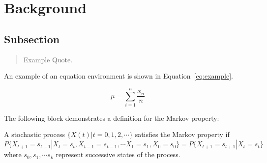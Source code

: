 \chapter{Background}

\lipsum[5]


\section{Subsection\label{sec:subsection}}

\lipsum[6]

\begin{quote}
	Example Quote. 
\end{quote}


\lipsum[7]

An example of an equation environment is shown in Equation~\ref{eq:example}.

\begin{equation}
	\label{eq:example}
 \mu = \sum_{i=1}^n \frac{x_n}{n}
\end{equation}

The following block demonstrates a definition for the Markov property:

\begin{definition}{}{} A stochastic process $\{X(t) | t=0,1,2, \cdots \}$ satisfies the Markov property if
$$
P\{X_{t+1} =   s_{t+1} | X_t =s_t, X_{t-1}=s_{t-1}, \cdots X_1=s_1, X_0=s_0\} =
P\{ X_{t+1} =  s_{t+1} | X_t =s_t \}
$$
where $s_0, s_1, \cdots s_k$ represent successive states of the  process.
\end{definition}



